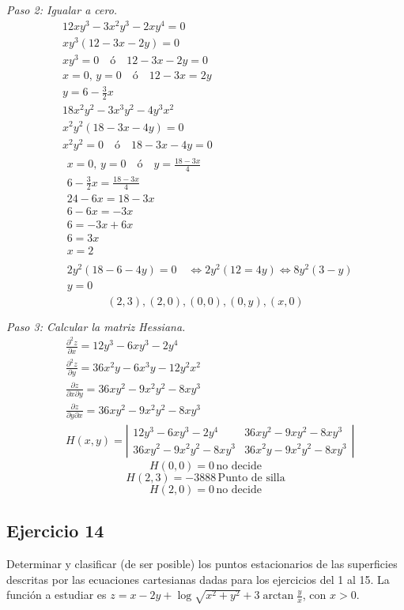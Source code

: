 \documentclass{report}
\begin{document}
\textit{Paso 2: Igualar a cero.}
\[
\begin{aligned}
& 12xy^{3} - 3x^{2}y^{3} - 2xy^{4} = 0 \\
& xy^{3}(12 - 3x - 2y) = 0 \\
& xy^{3} = 0 \quad \text{ó} \quad 12 - 3x - 2y = 0 \\
& x = 0, \, y = 0 \quad \text{ó} \quad 12 - 3x = 2y \\
& y = 6 - \frac{3}{2}x \\
& 18x^{2}y^{2} - 3x^{3}y^{2} - 4y^{3}x^{2} \\
& x^{2}y^{2}(18 - 3x - 4y) = 0 \\
& x^{2}y^{2} = 0 \quad \text{ó} \quad 18 - 3x - 4y = 0 \\
& \begin{array}{l}
x = 0, \, y = 0 \quad \text{ó} \quad y = \frac{18 - 3x}{4} \\
6 - \frac{3}{2}x = \frac{18 - 3x}{4} \\
24 - 6x = 18 - 3x \\
6 - 6x = -3x \\
6 = -3x + 6x \\
6 = 3x \\
x = 2
\end{array} \\
& \begin{array}{l}
2y^{2}(18 - 6 - 4y) = 0 \quad \Leftrightarrow 2y^{2}(12 = 4y) \Leftrightarrow 8y^{2}(3-y) \\
y = 0
\end{array}
\end{aligned}
\]
\[ (2,3), (2,0), (0,0), (0,y), (x,0) \]

\textit{Paso 3: Calcular la matriz Hessiana.}
\[
\begin{aligned}
& \frac{\partial^{2} z}{\partial x} = 12y^{3} - 6xy^{3} - 2y^{4} \\
& \frac{\partial^{2} z}{\partial y} = 36x^{2}y - 6x^{3}y - 12y^{2}x^{2} \\
& \frac{\partial z}{\partial x \partial y} = 36xy^{2} - 9x^{2}y^{2} - 8xy^{3} \\
& \frac{\partial z}{\partial y \partial x} = 36xy^{2} - 9x^{2}y^{2} - 8xy^{3} \\
& H(x, y) = \left|\begin{array}{ll}
12y^{3} - 6xy^{3} - 2y^{4} & 36xy^{2} - 9xy^{2} - 8xy^{3} \\
36xy^{2} - 9x^{2}y^{2} - 8xy^{3} & 36x^{2}y - 9x^{2}y^{2} - 8xy^{3}
\end{array}\right|
\end{aligned}
\]
\[ H(0,0) = 0 \, \text{no decide} \]
\[ H(2,3) = -3888 \, \text{Punto de silla} \]
\[ H(2,0) = 0 \, \text{no decide} \]\subsection{Ejercicio 14}
Determinar y clasificar (de ser posible) los puntos estacionarios de las superficies descritas por las ecuaciones cartesianas dadas para los ejercicios del 1 al 15.
La función a estudiar es $z=x-2 y+\log \sqrt{x^{2}+y^{2}}+3 \arctan \frac{y}{x}$, con $x>0$. 
\end{document}
